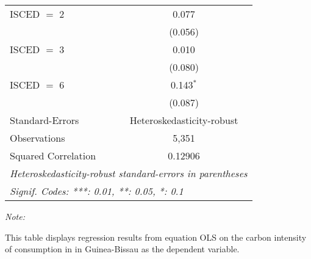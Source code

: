 \begin{table}[htbp!]
\begin{adjustbox}{width = 1\textwidth, max height = 0.95\textheight, center}
\begin{threeparttable}[b]
\begin{tabular}{lc}
            ISCED $=$ 2         & 0.077\\   
                                & (0.056)\\   
            ISCED $=$ 3         & 0.010\\   
                                & (0.080)\\   
            ISCED $=$ 6         & 0.143$^{*}$\\   
                                & (0.087)\\   
            \midrule 
            Standard-Errors     & Heteroskedasticity-robust \\   
            Observations        & 5,351\\  
            Squared Correlation & 0.12906\\  
            \midrule \midrule
            \multicolumn{2}{l}{\emph{Heteroskedasticity-robust standard-errors in parentheses}}\\
            \multicolumn{2}{l}{\emph{Signif. Codes: ***: 0.01, **: 0.05, *: 0.1}}\\
         \end{tabular}
         
         \begin{tablenotes}\item \medskip \textit{Note:}
            \item This table displays regression results from equation OLS on the carbon intensity of consumption in  in Guinea-Bissau as the dependent variable. 
         \end{tablenotes}
      \end{threeparttable}
   \end{adjustbox}
\end{table}



